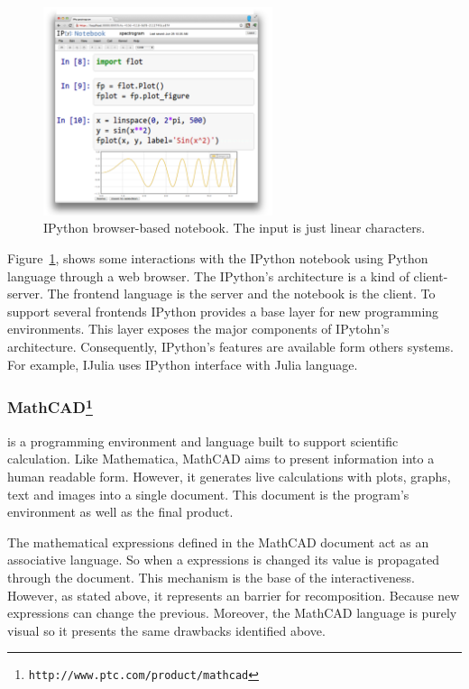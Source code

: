\begin{figure}
  \vspace{-35pt}
  \begin{center}
    \includegraphics[width=0.6\textwidth]{img/ipython-zoom}
  \end{center}
  \vspace{-15pt}
 \caption{IPython browser-based notebook. The input is just linear characters.}  
  \vspace{-15pt}
    \label{fig:ipython}
\end{figure}

Figure~\ref{fig:ipython}, shows some interactions with the IPython notebook using Python language through a web browser. The IPython's architecture is a kind of client-server. The frontend language is the server and the notebook is the client. To support several frontends IPython provides a base layer for new programming environments. This layer exposes the major components of IPytohn's architecture. Consequently, IPython's features are available form others systems. For example, IJulia uses IPython interface with Julia language. 
\subsubsection{MathCAD\protect\footnote{\texttt{http://www.ptc.com/product/mathcad}}} is a programming environment and language built to support scientific calculation. Like Mathematica, MathCAD aims to present information into a human readable form. However, it generates live calculations with plots, graphs, text and images into a single document. This document is the program's environment as well as the final product.

The mathematical expressions defined in the MathCAD document act as an associative language. So when a expressions is changed its value is propagated through the document. This mechanism is the base of the interactiveness. However, as stated above, it represents an barrier for recomposition. Because new expressions can change the previous. Moreover, the MathCAD language is purely visual so it presents the same drawbacks identified above.

